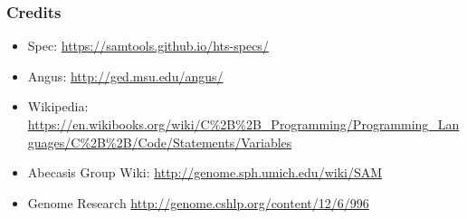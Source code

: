 \documentclass[xcolor=table]{beamer}
\begin{document}
\begin{frame}[fragile]
\frametitle{Credits}
\begin{itemize}
\item Spec: \url{https://samtools.github.io/hts-specs/}
\item Angus: \url{http://ged.msu.edu/angus/}
\item Wikipedia: \url{https://en.wikibooks.org/wiki/C%2B%2B_Programming/Programming_Languages/C%2B%2B/Code/Statements/Variables}
\item Abecasis Group Wiki: \url{http://genome.sph.umich.edu/wiki/SAM}
\item Genome Research \url{http://genome.cshlp.org/content/12/6/996}
\end{itemize}
\end{frame}
\end{document}

